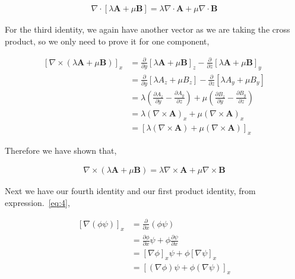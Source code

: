 \documentclass[11pt]{amsart}
\begin{document}
\begin{align*}
  \nabla\cdot[\lambda\mathbf{A} + \mu\mathbf{B}] = \lambda \nabla \cdot \mathbf{A} + \mu \nabla \cdot \mathbf{B}
\end{align*}

For the third identity, we again have another vector as we are taking the cross product, so we only need to prove it for one component,

\begin{align*}
  {\left[\nabla\times(\lambda\mathbf{A}+\mu\mathbf{B})\right]}_x &= \frac{\partial}{\partial y}{[\lambda\mathbf{A}+\mu\mathbf{B}]}_z - \frac{\partial}{\partial z}{[\lambda\mathbf{A}+\mu\mathbf{B}]}_y \\
                                                                 &= \frac{\partial}{\partial y}[\lambda A_z+\mu B_z] - \frac{\partial}{\partial z}[\lambda A_y+\mu B_y] \\
                                                                 &= \lambda\left(\frac{\partial A_z}{\partial y} - \frac{\partial A_y}{\partial z}\right) + \mu\left(\frac{\partial B_z}{\partial y} - \frac{\partial B_y}{\partial z}\right) \\
                                                                 &= \lambda{(\nabla\times\mathbf{A})}_x + \mu{(\nabla\times\mathbf{A})}_x \\
                                                                 &= {[\lambda(\nabla\times\mathbf{A}) + \mu(\nabla\times\mathbf{A})]}_x
\end{align*}

Therefore we have shown that,

\begin{align*}
  \nabla\times(\lambda\mathbf{A} + \mu\mathbf{B}) = \lambda \nabla\times\mathbf{A} + \mu \nabla\times\mathbf{B}
\end{align*}

Next we have our fourth identity and our first product identity, from expression.~\ref{eq:4},

\begin{align*}
  {[\nabla(\phi\psi)]}_x &= \frac{\partial}{\partial x}(\phi\psi) \\
                         &= \frac{\partial \phi}{\partial x}\psi + \phi\frac{\partial\psi}{\partial x} \\
                         &= {[\nabla\phi]}_x\psi + \phi{[\nabla\psi]}_x \\
                         &= {[(\nabla\phi)\psi + \phi(\nabla\psi)]}_x
\end{align*}
\end{document}
